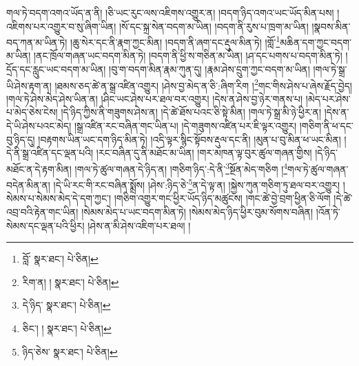 གལ་ཏེ་བདག་འགའ་ཡོད་ན་ནི། །ཅི་ཡང་རུང་ལས་འཇིགས་འགྱུར་ན། །བདག་ཉིད་འགའ་ཡང་ཡོད་མིན་པས། །འཇིགས་པར་འགྱུར་བ་སུ་ཞིག་ཡིན། །སོ་དང་སྐྲ་སེན་བདག་མ་ཡིན། །བདག་ནི་རུས་པ་ཁྲག་མ་ཡིན། །སྣབས་མིན་བད་ཀན་མ་ཡིན་ཏེ། །ཆུ་སེར་དང་ནི་རྣག་ཀྱང་མིན། །བདག་ནི་ཞག་དང་རྡུལ་མིན་ཏེ། །གློ་\footnote{བློ་  སྣར་ཐང་།  པེ་ཅིན། }མཆིན་དག་ཀྱང་བདག་མ་ཡིན། །ནང་ཁྲོལ་གཞན་ཡང་བདག་མིན་ཏེ། །བདག་ནི་ཕྱི་ས་གཅིན་མ་ཡིན། །ཤ་དང་པགས་པ་བདག་མིན་ཏེ། །དྲོད་དང་རླུང་ཡང་བདག་མ་ཡིན། །བུ་ག་བདག་མིན་རྣམ་ཀུན་དུ། །རྣམ་ཤེས་དྲུག་ཀྱང་བདག་མ་ཡིན། །གལ་ཏེ་སྒྲ་ཡི་ཤེས་རྟག་ན། །ཐམས་ཅད་ཚེ་ན་སྒྲ་འཛིན་འགྱུར། །ཤེས་བྱ་མེད་ན་ཅི་:ཞིག་རིག །\footnote{རིག་ན། །  སྣར་ཐང་།  པེ་ཅིན། }གང་གིས་ཤེས་པ་ཞེས་རྗོད་བྱེད། །གལ་ཏེ་ཤེས་མེད་ཤེས་ཡིན་ན། །ཤིང་ཡང་ཤེས་པར་ཐལ་བར་འགྱུར། །དེས་ན་ཤེས་བྱ་ཉེར་གནས་པ། །མེད་པར་ཤེས་པ་མེད་ཅེས་ངེས། །དེ་ཉིད་ཀྱིས་ནི་གཟུགས་ཤེས་ན། །དེ་ཚེ་ཐོས་པའང་ཅི་སྟེ་མིན། །གལ་ཏེ་སྒྲ་མི་ཉེ་ཕྱིར་ན། །དེས་ན་དེ་ཡི་ཤེས་པའང་མེད། །སྒྲ་འཛིན་རང་བཞིན་གང་ཡིན་པ། །དེ་གཟུགས་འཛིན་པར་ཇི་ལྟར་འགྱུར། །གཅིག་ནི་ཕ་དང་བུ་ཉིད་དུ། །བརྟགས་ཡིན་ཡང་དག་ཉིད་མིན་ཏེ། །འདི་ལྟར་སྙིང་སྟོབས་རྡུལ་དང་ནི། །མུན་པ་བུ་མིན་ཕ་ཡང་མིན། །དེ་ནི་སྒྲ་འཛིན་དང་ལྡན་པའི། །རང་བཞིན་དུ་ནི་མཐོང་མ་ཡིན། །གར་མཁན་ལྟ་བུར་ཚུལ་གཞན་གྱིས། །དེ་ཉིད་མཐོང་ན་དེ་རྟག་མིན། །གལ་ཏེ་ཚུལ་གཞན་དེ་ཉིད་ན། །གཅིག་ཉིད་:དེ་ནི་\footnote{དེ་ཉིད་  སྣར་ཐང་།  པེ་ཅིན། }སྔོན་མེད་གཅིག །\footnote{ཅིང་། །  སྣར་ཐང་།  པེ་ཅིན། }གལ་ཏེ་ཚུལ་གཞན་བདེན་མིན་ན། །དེ་ཡི་རང་གི་རང་བཞིན་སྨྲོས། །ཤེས་:ཉིད་ཅེ་\footnote{ཉིད་ཅེས་  སྣར་ཐང་།  པེ་ཅིན། }ན་དེ་ལྟ་ན། །སྐྱེས་ཀུན་གཅིག་ཏུ་ཐལ་བར་འགྱུར། །སེམས་པ་སེམས་མེད་དེ་དག་ཀྱང་། །གཅིག་འགྱུར་གང་ཕྱིར་ཡོད་ཉིད་མཚུངས། །གང་ཚེ་བྱེ་བྲག་ཕྱིན་ཅི་ལོག །དེ་ཚེ་འབྲ་བའི་རྟེན་གང་ཡིན། །སེམས་མེད་པ་ཡང་བདག་མིན་ཏེ། །སེམས་མེད་ཉིད་ཕྱིར་བུམ་སོགས་བཞིན། །འོན་ཏེ་སེམས་དང་ལྡན་པའི་ཕྱིར། །ཤེས་ན་མི་ཤེས་འཇིག་པར་ཐལ། །
